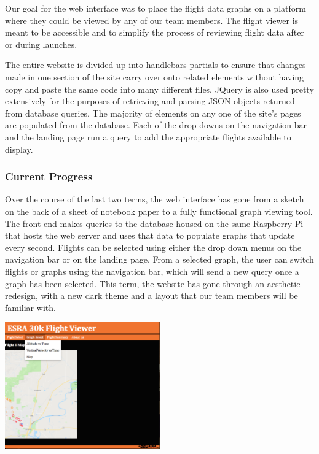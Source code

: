 \documentclass[onecolumn, draftclsnofoot, 10pt, compsoc]{IEEEtran}
\begin{document}
Our goal for the web interface was to place the flight data graphs on a platform where they could be viewed by any of our team members. 
The flight viewer is meant to be accessible and to simplify the process of reviewing flight data after or during launches.

The entire website is divided up into handlebars partials to ensure that changes made in one section of the site carry over onto related elements without having copy and paste the same code into many different files. 
JQuery is also used pretty extensively for the purposes of retrieving and parsing JSON objects returned from database queries. 
The majority of elements on any one of the site's pages are populated from the database. Each of the drop downs on the navigation bar and the landing page run a query to add the appropriate flights available to display.

\subsubsection{Current Progress}
Over the course of the last two terms, the web interface has gone from a sketch on the back of a sheet of notebook paper to a fully functional graph viewing tool. The front end makes queries to the database housed on the same Raspberry Pi that hosts the web server and uses that data to populate graphs that update every second. Flights can be selected using either the drop down menus on the navigation bar or on the landing page. From a selected graph, the user can switch flights or graphs using the navigation bar, which will send a new query once a graph has been selected. This term, the website has gone through an aesthetic redesign, with a new dark theme and a layout that our team members will be familiar with.

\begin{center}
	\includegraphics[width=0.5\textwidth]{images/smallMap.eps}
    \label{map}
\end{center}
       
\end{document}
